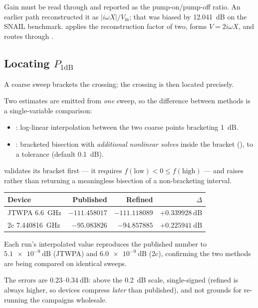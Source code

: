 \begin{caveat}
Gain must be read through  and reported as
the pump-on/pump-off ratio. An earlier path reconstructed it as
$|i\omega X|/V_{\mathrm{in}}$; that was biased by \SI{12.041}{\dB} on the SNAIL
benchmark.  applies the reconstruction factor of two, forms
$V = 2i\omega X$, and routes through
.
\end{caveat}

\subsection{\texorpdfstring{Locating $P_{1\mathrm{dB}}$}{Locating P1dB}}

A coarse sweep brackets the crossing; the crossing is then located precisely.

\begin{implnote}
Two estimates are emitted from \emph{one} sweep, so the difference between
methods is a single-variable comparison:
\begin{itemize}
\item {}: log-linear interpolation between the two
      coarse points bracketing \SI{1}{\dB}.
\item {}: bracketed bisection with \emph{additional nonlinear solves}
      inside the bracket (), to a tolerance
       (default \SI{0.1}{\dB}).
\end{itemize}
 validates its bracket first --- it requires
$f(\text{low})<0\le f(\text{high})$ --- and raises rather than returning a
meaningless bisection of a non-bracketing interval.
\end{implnote}

\begin{measured}
\begin{center}
\begin{tabular}{@{}l r r r@{}}
\toprule
Device & Published & Refined & $\Delta$ \\
\midrule
JTWPA \SI{6.6}{\giga\hertz} & $-111.458017$ & $-111.118089$ & $+\SI{0.339928}{\dB}$ \\
2c \SI{7.440816}{\giga\hertz} & $-95.083826$ & $-94.857885$ & $+\SI{0.225941}{\dB}$ \\
\bottomrule
\end{tabular}
\end{center}
Each run's interpolated value reproduces the published number to
$\SI{5.1e-9}{\dB}$ (JTWPA) and $\SI{6.0e-9}{\dB}$ (2c), confirming the two
methods are being compared on identical sweeps.

The errors are $0.23$--$\SI{0.34}{\dB}$: above the \SI{0.2}{\dB} scale,
single-signed (refined is always higher, so devices compress \emph{later} than
published), and not grounds for re-running the campaigns wholesale.
\end{measured}

